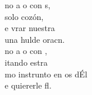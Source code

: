 \documentclass[12pt]{article}
\begin{document}
\begin{multicols*}{2}
\begin{cancion}
	\begin{chorus}%
	no a o con s,\\
	 solo cozón,\\
	e vrar nuestra   \\
	 una hulde oracn.\\
	no a o con , \\
	itando estra \\
	mo instrunto en os dÉl\\
	e quiererle fl.\\
	\end{chorus}%
	\jump\\
\end{cancion}%


\end{multicols*}
\end{document}
